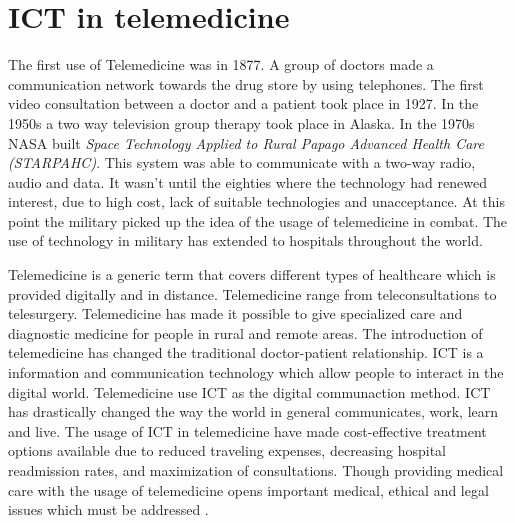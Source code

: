 \section{ICT in telemedicine}

The first use of Telemedicine was in 1877. A group of doctors made a communication network towards the drug store by using telephones. The first video consultation between a doctor and a patient took place in 1927. In the 1950s a two way television group therapy took place in Alaska. In the 1970s NASA built \textit{Space Technology Applied to Rural Papago Advanced Health Care (STARPAHC)}. This system was able to communicate with a two-way radio, audio and data. It wasn't until the eighties where the technology had renewed interest, due to high cost, lack of suitable technologies and unacceptance. At this point the military picked up the idea of the usage of telemedicine in combat. The use of technology in military has extended to hospitals throughout the world. 


Telemedicine is a generic term that covers different types of healthcare which is provided digitally and in distance. Telemedicine range from teleconsultations to telesurgery. Telemedicine has made it possible to give specialized care and diagnostic medicine for people in rural and remote areas. The introduction of telemedicine has changed the traditional doctor-patient relationship. 
ICT is a information and communication technology which allow people to interact in the digital world. Telemedicine use ICT as the digital communaction method. ICT has drastically changed the way the world in general communicates, work, learn and live.   
The usage of ICT in telemedicine have made cost-effective treatment options available due to reduced traveling expenses, decreasing hospital readmission rates, and maximization of consultations. Though providing medical care with the usage of telemedicine opens important medical, ethical and legal issues which must be addressed \cite{considerations}.


